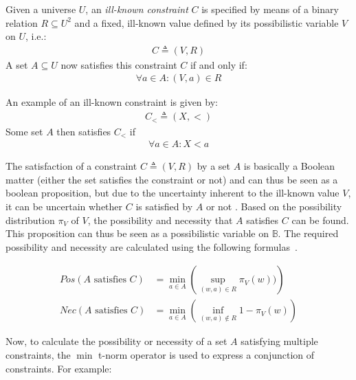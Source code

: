 \begin{svgraybox}
\vspace{-10pt}
\begin{definition}
Given a universe $U$, an \emph{ill-known constraint} $C$ is specified by means of a binary relation $R \subseteq U^{2}$ and a fixed, ill-known value defined by its possibilistic variable $V$ on $U$, i.e.:
\begin{align}
C \triangleq (V,R) \nonumber
\end{align}
A set $A \subseteq U$ now satisfies this constraint $C$ if and only if:
\begin{align}
\forall a \in A : (V,a) \in R \nonumber
\end{align}
\end{definition}
\vspace{-10pt}
\end{svgraybox}

An example of an ill-known constraint is given by:
\begin{align}
C_{<} \triangleq (X, <) \nonumber
\end{align}
Some set $A$ then satisfies $C_{<}$ if 
\begin{align}
\forall a \in A : X <a \nonumber
\end{align}

The satisfaction of a constraint $C \triangleq (V,R)$ by a set $A$ is basically a Boolean matter (either the set satisfies the constraint or not) and can thus be seen as a boolean proposition, but due to the uncertainty inherent to the ill-known value $V$, it can be uncertain whether $C$ is satisfied by $A$ or not \cite{Pon11}. Based on the possibility distribution $\pi_{V}$ of $V$, the possibility and necessity that $A$ satisfies $C$ can be found. This proposition can thus be seen as a possibilistic variable on $\mathbb{B}$. The required possibility and necessity are calculated using the following formulas~\cite{Pon11}.

\begin{align}
Pos(A\text{ satisfies }C) & = \min_{a \in A}\left(\sup_{(w,a) \in R}\pi_{V}(w))\right) \label{eq:pos}\\
Nec(A\text{ satisfies }C) & = \min_{a \in A}\left(\inf_{(w,a) \notin R} 1-\pi_{V}(w)\right) \label{eq:nec}
\end{align}

Now, to calculate the possibility or necessity of a set $A$ satisfying multiple constraints, the $\min$ t-norm operator is used to express a conjunction of constraints. For example:

